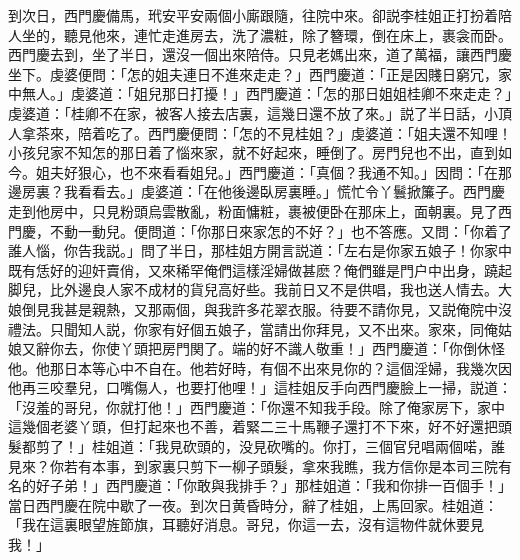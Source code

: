 到次日，西門慶備馬，玳安平安兩個小廝跟隨，往院中來。卻説李桂姐正打扮着陪人坐的，聽見他來，連忙走進房去，洗了濃粧，除了簪環，倒在床上，裹衾而卧。西門慶去到，坐了半日，還沒一個出來陪侍。只見老媽出來，道了萬福，讓西門慶坐下。虔婆便問：「怎的姐夫連日不進來走走？」西門慶道：「正是因賤日窮冗，家中無人。」虔婆道：「姐兒那日打擾！」西門慶道：「怎的那日姐姐桂卿不來走走？」虔婆道：「桂卿不在家，被客人接去店裏，這幾日還不放了來。」説了半日話，小頂人拿茶來，陪着吃了。西門慶便問：「怎的不見桂姐？」虔婆道：「姐夫還不知哩！小孩兒家不知怎的那日着了惱來家，就不好起來，睡倒了。房門兒也不出，直到如今。姐夫好狠心，也不來看看姐兒。」西門慶道：「真個？我通不知。」因問：「在那邊房裏？我看看去。」虔婆道：「在他後邊臥房裏睡。」慌忙令丫鬟掀簾子。西門慶走到他房中，只見粉頭烏雲散亂，粉面慵粧，裹被便卧在那床上，面朝裏。見了西門慶，不動一動兒。便問道：「你那日來家怎的不好？」也不答應。又問：「你着了誰人惱，你告我説。」問了半日，那桂姐方開言説道：「左右是你家五娘子！你家中既有恁好的迎奸賣俏，又來稀罕俺們這樣淫婦做甚麽？俺們雖是門户中出身，蹺起脚兒，比外邊良人家不成材的貨兒高好些。我前日又不是供唱，我也送人情去。大娘倒見我甚是親熱，又那兩個，與我許多花翠衣服。待要不請你見，又説俺院中沒禮法。只聞知人説，你家有好個五娘子，當請出你拜見，又不出來。家來，同俺姑娘又辭你去，你使丫頭把房門関了。端的好不識人敬重！」西門慶道：「你倒休怪他。他那日本等心中不自在。他若好時，有個不出來見你的？這個淫婦，我幾次因他再三咬羣兒，口嘴傷人，也要打他哩！」這桂姐反手向西門慶臉上一掃，説道：「沒羞的哥兒，你就打他！」西門慶道：「你還不知我手段。除了俺家房下，家中這幾個老婆丫頭，但打起來也不善，着緊二三十馬鞭子還打不下來，好不好還把頭髮都剪了！」桂姐道：「我見砍頭的，没見砍嘴的。你打，三個官兒唱兩個喏，誰見來？你若有本事，到家裏只剪下一柳子頭髮，拿來我瞧，我方信你是本司三院有名的好子弟！」西門慶道：「你敢與我排手？」那桂姐道：「我和你排一百個手！」當日西門慶在院中歇了一夜。到次日黄昏時分，辭了桂姐，上馬回家。桂姐道：「我在這裏眼望旌節旗，耳聽好消息。哥兒，你這一去，沒有這物件就休要見我！」

